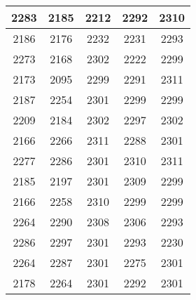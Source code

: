 \documentclass{article}
\begin{document}
\begin{table}[htb]
\begin{tabular}{c|c|c|c|c}
	\multicolumn{1}{c}{2283} &	\multicolumn{1}{c}{2185} &	\multicolumn{1}{c}{2212} &	\multicolumn{1}{c}{2292} &	\multicolumn{1}{c}{2310}  \\ \hline 
	\multicolumn{1}{c}{2186} &	\multicolumn{1}{c}{2176} &	\multicolumn{1}{c}{2232} &	\multicolumn{1}{c}{2231} &	\multicolumn{1}{c}{2293}  \\ \hline 
	\multicolumn{1}{c}{2273} &	\multicolumn{1}{c}{2168} &	\multicolumn{1}{c}{2302} &	\multicolumn{1}{c}{2222} &	\multicolumn{1}{c}{2299}  \\ \hline 
	\multicolumn{1}{c}{2173} &	\multicolumn{1}{c}{2095} &	\multicolumn{1}{c}{2299} &	\multicolumn{1}{c}{2291} &	\multicolumn{1}{c}{2311}  \\ \hline 
	\multicolumn{1}{c}{2187} &	\multicolumn{1}{c}{2254} &	\multicolumn{1}{c}{2301} &	\multicolumn{1}{c}{2299} &	\multicolumn{1}{c}{2299}  \\ \hline 
	\multicolumn{1}{c}{2209} &	\multicolumn{1}{c}{2184} &	\multicolumn{1}{c}{2302} &	\multicolumn{1}{c}{2297} &	\multicolumn{1}{c}{2302}  \\ \hline 
	\multicolumn{1}{c}{2166} &	\multicolumn{1}{c}{2266} &	\multicolumn{1}{c}{2311} &	\multicolumn{1}{c}{2288} &	\multicolumn{1}{c}{2301}  \\ \hline 
	\multicolumn{1}{c}{2277} &	\multicolumn{1}{c}{2286} &	\multicolumn{1}{c}{2301} &	\multicolumn{1}{c}{2310} &	\multicolumn{1}{c}{2311}  \\ \hline 
	\multicolumn{1}{c}{2185} &	\multicolumn{1}{c}{2197} &	\multicolumn{1}{c}{2301} &	\multicolumn{1}{c}{2309} &	\multicolumn{1}{c}{2299}  \\ \hline 
	\multicolumn{1}{c}{2166} &	\multicolumn{1}{c}{2258} &	\multicolumn{1}{c}{2310} &	\multicolumn{1}{c}{2299} &	\multicolumn{1}{c}{2299}  \\ \hline 
	\multicolumn{1}{c}{2264} &	\multicolumn{1}{c}{2290} &	\multicolumn{1}{c}{2308} &	\multicolumn{1}{c}{2306} &	\multicolumn{1}{c}{2293}  \\ \hline 
	\multicolumn{1}{c}{2286} &	\multicolumn{1}{c}{2297} &	\multicolumn{1}{c}{2301} &	\multicolumn{1}{c}{2293} &	\multicolumn{1}{c}{2230}  \\ \hline 
	\multicolumn{1}{c}{2264} &	\multicolumn{1}{c}{2287} &	\multicolumn{1}{c}{2301} &	\multicolumn{1}{c}{2275} &	\multicolumn{1}{c}{2301}  \\ \hline 
	\multicolumn{1}{c}{2178} &	\multicolumn{1}{c}{2264} &	\multicolumn{1}{c}{2301} &	\multicolumn{1}{c}{2292} &	\multicolumn{1}{c}{2301}  \\ \hline 

\end{tabular}
\end{table}
\end{document}
